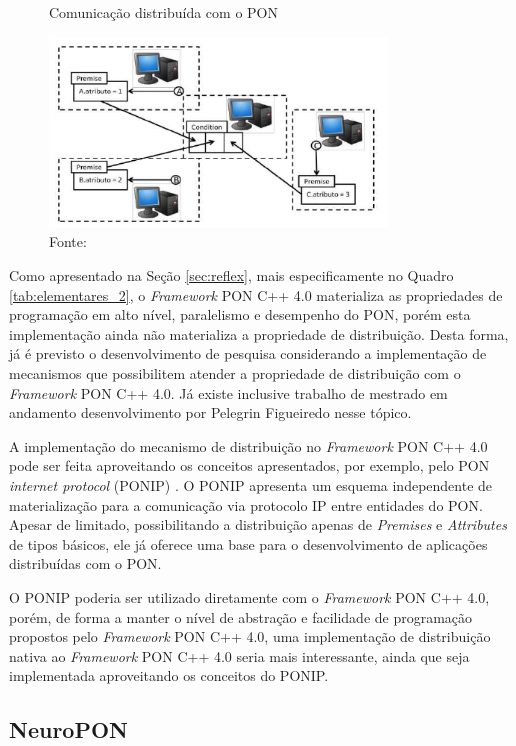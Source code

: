 \begin{figure}[!htb]
\centering
\caption{Comunicação distribuída com o PON}
\includegraphics[width=0.8\textwidth]{../figures/pon_dist.PNG}
\smallskip
\caption*{Fonte: }
\label{fig:pon_dist}
\end{figure}

Como apresentado na Seção \ref{sec:reflex}, mais especificamente no Quadro
\ref{tab:elementares_2}, o \textit{Framework} PON C++ 4.0 materializa as
propriedades de programação em alto nível, paralelismo e desempenho do PON,
porém esta implementação ainda não materializa a propriedade de distribuição.
Desta forma, já é previsto o desenvolvimento de pesquisa considerando a
implementação de mecanismos que possibilitem atender a propriedade de
distribuição com o \textit{Framework} PON C++ 4.0. Já existe inclusive trabalho
de mestrado em andamento desenvolvimento por Pelegrin Figueiredo nesse
tópico.

A implementação do mecanismo de distribuição no \textit{Framework} PON C++ 4.0
pode ser feita aproveitando os conceitos apresentados, por exemplo, pelo PON
\textit{internet protocol} (PONIP) \cite{talau_2016}. O PONIP apresenta um
esquema independente de materialização para a comunicação via protocolo IP entre
entidades do PON. Apesar de limitado, possibilitando a distribuição apenas de
\textit{Premises} e \textit{Attributes} de tipos básicos, ele já oferece uma
base para o desenvolvimento de aplicações distribuídas com o PON.

O PONIP poderia ser utilizado diretamente com o \textit{Framework} PON C++ 4.0,
porém, de forma a manter o nível de abstração e facilidade de programação
propostos pelo \textit{Framework} PON C++ 4.0, uma implementação de distribuição
nativa ao \textit{Framework} PON C++ 4.0 seria mais interessante, ainda que seja
implementada aproveitando os conceitos do PONIP.

\subsection{NeuroPON}\label{sec:neuropon_futuro}

